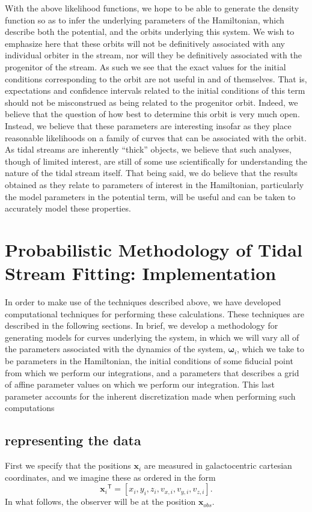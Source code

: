 \documentclass[12pt,preprint]{aastex}
\theoremstyle{plain}
\theoremstyle{definition}
\newcommand{\mtensor}[1]{\boldsymbol{#1}}
\newcommand{\mvector}[1]{\mtensor{#1}}
\newcommand{\vx}{\mvector{x}}
\newcommand{\vomega}{\mvector{\omega}}
\newcommand{\transpose}[1]{{#1}^{\textsf{T}}}
\begin{document}
With the above likelihood functions, we hope to be able to generate the density function so as to infer the underlying parameters of the Hamiltonian, which describe both the potential, and the orbits underlying this system. We wish to emphasize here that these orbits will not be definitively associated with any individual orbiter in the stream, nor will they be definitively associated with the progenitor of the stream. As such we see that the exact values for the initial conditions corresponding to the orbit are not useful in and of themselves. That is, expectations and confidence intervals related to the initial conditions of this term should not be misconstrued as being related to the progenitor orbit. Indeed, we believe that the question of how best to determine this orbit is very much open. Instead, we believe that these parameters are interesting insofar as they place reasonable likelihoods on a family of curves that can be associated with the orbit. As tidal streams are inherently ``thick'' objects, we believe that such analyses, though of limited interest, are still of some use scientifically for understanding the nature of the tidal stream itself. That being said, we do believe that the results obtained as they relate to parameters of interest in the Hamiltonian, particularly the model parameters in the potential term, will be useful and can be taken to accurately model these properties.



\section{\label{sec:imp} Probabilistic Methodology of Tidal Stream Fitting:  Implementation}
In order to make use of the techniques described above, we have developed computational techniques for performing these calculations. These techniques are described in the following sections. In brief, we develop a methodology for generating models for curves underlying the system, in which we will vary all of the parameters associated with the dynamics of the system, $\vomega_i$, which we take to be parameters in the Hamiltonian,  the initial conditions of some fiducial point from which we perform our integrations,  and a parameters that describes a grid of affine parameter values on which we perform our integration. This last parameter accounts for the inherent discretization made when performing such computations

\subsection{representing the data}
First we specify that the positions $\vx_i$ are measured in galactocentric cartesian coordinates, and we imagine these as ordered in the form
\[
\transpose{\vx_i} = [x_i,y_i,z_i, v_{x,i}, v_{y,i}, v_{z,i}].
\]
In what follows, the observer will be at the position $\vx_{obs}$.
\end{document}
